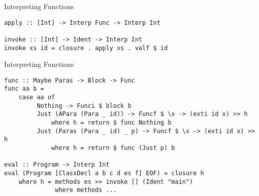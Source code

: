\documentclass[12pt]{beamer}
\newcommand{\codesize}{\fontsize{7.7}{7.7}}
\begin{document}
\begin{spacing}{1.3}
\begin{frame}[fragile=singleslide]{Interpreting Functions}
\begin{verbatim}
apply :: [Int] -> Interp Func -> Interp Int

invoke :: [Int] -> Ident -> Interp Int
invoke xs id = closure . apply xs . valf $ id
\end{verbatim}
\end{frame}

\begin{frame}[fragile=singleslide]{Interpreting Functions}
\begin{verbatim}
func :: Maybe Paras -> Block -> Func
func aa b =
    case aa of
         Nothing -> Funci $ block b
         Just (APara (Para _ id)) -> Funcf $ \x -> (exti id x) >> h
             where h = return $ func Nothing b
         Just (Paras (Para _ id) _ p) -> Funcf $ \x -> (exti id x) >> h
             where h = return $ func (Just p) b

eval :: Program -> Interp Int
eval (Program [ClassDecl a b c d es f] EOF) = closure h
    where h = methods es >> invoke [] (Ident "main")
              where methods ...
\end{verbatim}
\end{frame}

\end{spacing}
\end{document}

